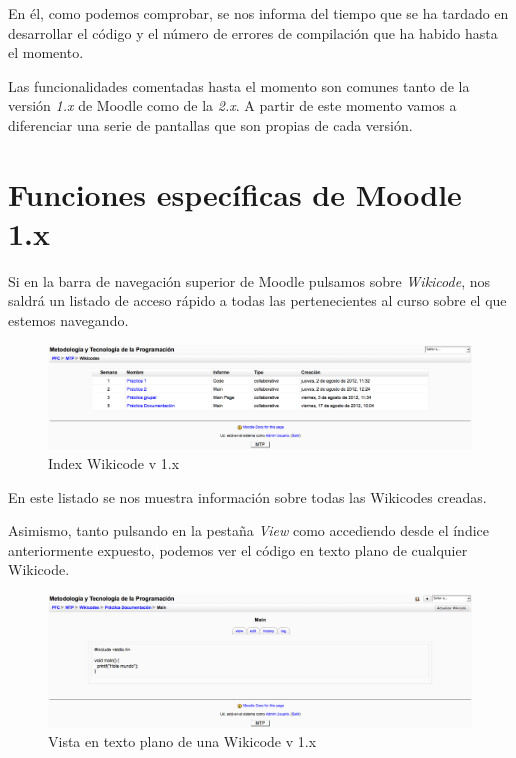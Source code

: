 En él, como podemos comprobar, se nos informa del tiempo que se ha tardado en desarrollar el código y el número de errores de compilación que ha habido hasta el momento.

Las funcionalidades comentadas hasta el momento son comunes tanto de la versión \emph{1.x} de Moodle como de la \emph{2.x}. A partir de este momento vamos a diferenciar una serie de pantallas que son propias de cada versión.

\section{Funciones específicas de Moodle 1.x}

Si en la barra de navegación superior de Moodle pulsamos sobre \emph{Wikicode}, nos saldrá un listado de acceso rápido a todas las pertenecientes al curso sobre el que estemos navegando.

\begin{figure}[h]
	\label{v1index.eps}
	\includegraphics[width=\textwidth]{./img/v1index.eps}
	\caption{Index Wikicode v 1.x}
\end{figure}

En este listado se nos muestra información sobre todas las Wikicodes creadas.



Asimismo, tanto pulsando en la pestaña \emph{View} como accediendo desde el índice anteriormente expuesto, podemos ver el código en texto plano de cualquier Wikicode.

\begin{figure}[h]
	\label{v1view.eps}
	\includegraphics[width=\textwidth]{./img/v1view.eps}
	\caption{Vista en texto plano de una Wikicode v 1.x}
\end{figure}


